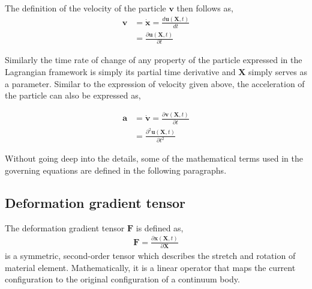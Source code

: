 The definition of the velocity of the particle $\mathbf{v}$ then follows as,
 \begin{align}
	\mathbf{v} 	&= \dot{\mathbf{x}} =  \frac{d \mathbf{u}(\mathbf{X},t)}{dt}\\
				&= \frac{\partial \mathbf{u}(\mathbf{X},t)}{\partial t}	
\end{align}

Similarly the time rate of change of any property of the particle expressed in the Lagrangian framework is simply its partial time derivative and $\mathbf{X}$ simply serves as a parameter. Similar to the expression of velocity given above, the acceleration of the particle can also be expressed as,

\begin{align}
	\mathbf{a} 	&= \dot{\mathbf{v}} =  \frac{\partial \mathbf{v}(\mathbf{X},t)}{\partial t}\\
				&= \frac{\partial^2 \mathbf{u}(\mathbf{X},t)}{\partial t^2}
\end{align}

Without going deep into the details, some of the mathematical terms used in the governing equations are defined in the following paragraphs.
\subsection*{Deformation gradient tensor}
The deformation gradient tensor $\mathbf{F}$ is defined as,
\begin{align}
	\mathbf{F} 	= \frac{\partial \mathbf{x}(\mathbf{X},t)}{\partial \mathbf{X}}
\end{align}
is a symmetric, second-order tensor which describes the stretch and rotation of material element. Mathematically, it is a linear operator that maps the current configuration to the original configuration of a continuum body.

